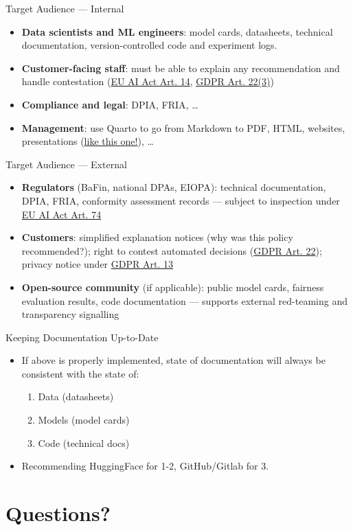 \documentclass[
  ignorenonframetext,
]{beamer}
\providecommand{\tightlist}{%
  \setlength{\itemsep}{0pt}\setlength{\parskip}{0pt}}
\begin{document}
\begin{frame}{Target Audience --- Internal}
\label{target-audience-internal}
\begin{itemize}
\tightlist
\item
  \textbf{Data scientists and ML engineers}: model cards, datasheets,
  technical documentation, version-controlled code and experiment logs.
\item
  \textbf{Customer-facing staff}: must be able to explain any
  recommendation and handle contestation
  (\href{https://artificialintelligenceact.eu/article/14/}{EU AI Act
  Art. 14}, \href{https://gdpr-info.eu/art-22-gdpr/}{GDPR Art. 22(3)})
\item
  \textbf{Compliance and legal}: DPIA, FRIA, \ldots{}
\item
  \textbf{Management}: use Quarto to go from Markdown to PDF, HTML,
  websites, presentations
  (\href{https://github.com/pat-alt/quarto-ergo}{like this one!}),
  \ldots{}
\end{itemize}
\end{frame}

\begin{frame}{Target Audience --- External}
\label{target-audience-external}
\begin{itemize}
\tightlist
\item
  \textbf{Regulators} (BaFin, national DPAs, EIOPA): technical
  documentation, DPIA, FRIA, conformity assessment records --- subject
  to inspection under
  \href{https://artificialintelligenceact.eu/article/74/}{EU AI Act Art.
  74}
\item
  \textbf{Customers}: simplified explanation notices (why was this
  policy recommended?); right to contest automated decisions
  (\href{https://gdpr-info.eu/art-22-gdpr/}{GDPR Art. 22}); privacy
  notice under \href{https://gdpr-info.eu/art-13-gdpr/}{GDPR Art. 13}
\item
  \textbf{Open-source community} (if applicable): public model cards,
  fairness evaluation results, code documentation --- supports external
  red-teaming and transparency signalling
\end{itemize}
\end{frame}

\begin{frame}{Keeping Documentation Up-to-Date}
\label{keeping-documentation-up-to-date}
\begin{itemize}
\tightlist
\item
  If above is properly implemented, state of documentation will always
  be consistent with the state of:

  \begin{enumerate}
  \tightlist
  \item
    Data (datasheets)
  \item
    Models (model cards)
  \item
    Code (technical docs)
  \end{enumerate}
\item
  Recommending HuggingFace for 1-2, GitHub/Gitlab for 3.
\end{itemize}
\end{frame}

\section{Questions?}\label{questions}
\end{document}
